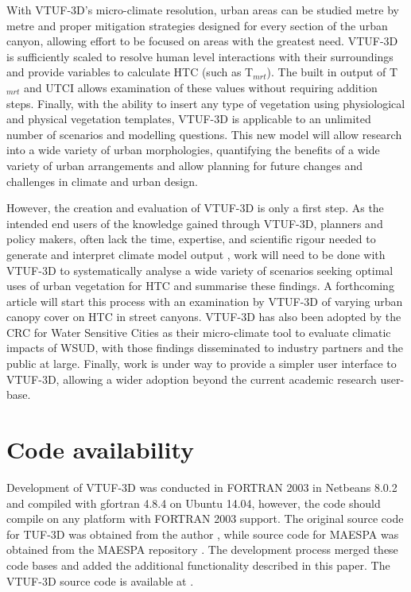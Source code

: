 \documentclass[final,3p,times,authoryear]{elsarticle}
\begin{document}
With VTUF-3D's micro-climate resolution, urban areas can be studied metre by metre and proper mitigation strategies designed for every section of the urban canyon, allowing effort to be focused on areas with the greatest need. VTUF-3D is sufficiently scaled to resolve human level interactions with their surroundings and provide variables to calculate HTC (such as T$_{mrt}$). The built in output of T$_{mrt}$ and UTCI allows examination of these values without requiring addition steps. Finally, with the ability to insert any type of vegetation using physiological and physical vegetation templates, VTUF-3D is applicable to an unlimited number of scenarios and modelling questions. This new model will allow research into a wide variety of urban morphologies, quantifying the benefits of a wide variety of urban arrangements and allow planning for future changes and challenges in climate and urban design.

However, the creation and evaluation of VTUF-3D is only a first step. As the intended end users of the knowledge gained through VTUF-3D, planners and policy makers, often lack the time, expertise, and scientific rigour needed to generate and interpret climate model output \citep{Elasson2000,Moser2014,Winkler2011}, work will need to be done with VTUF-3D to systematically analyse a wide variety of scenarios seeking optimal uses of urban vegetation for HTC and summarise these findings. A forthcoming article will start this process with an examination by VTUF-3D of varying urban canopy cover on HTC in street canyons. VTUF-3D has also been adopted by the CRC for Water Sensitive Cities as their micro-climate tool to evaluate climatic impacts of WSUD, with those findings disseminated to industry partners and the public at large. Finally, work is under way to provide a simpler user interface to VTUF-3D, allowing a wider adoption beyond the current academic research user-base.


\section{Code availability}\label{sec:available}

Development of VTUF-3D was conducted in FORTRAN 2003 \citep{GNU2016a} in Netbeans 8.0.2 \citep{Netbeans2016} and compiled with gfortran 4.8.4 \citep{GNU2016} on Ubuntu 14.04, however, the code should compile on any platform with FORTRAN 2003 support. The original source code for TUF-3D was obtained from the author \citep{Krayenhoff2007}, while source code for MAESPA was obtained from the MAESPA repository \citep{Duursma2016}. The development process merged these code bases and added the additional functionality described in this paper. The VTUF-3D source code is available at \cite{Nice2016c}.
\end{document}

